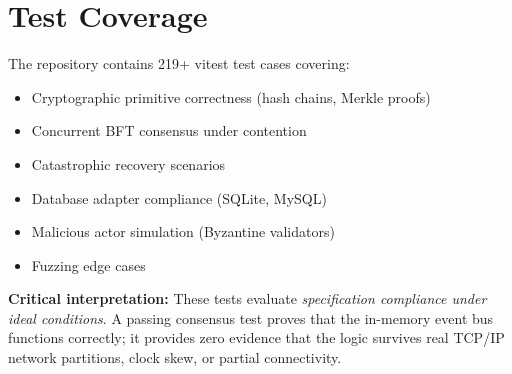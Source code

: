 \section{Test Coverage}
\label{app-sec:wdb-testing}

The repository contains 219+ vitest test cases covering:
\begin{itemize}[nosep]
    \item Cryptographic primitive correctness (hash chains, Merkle proofs)
    \item Concurrent BFT consensus under contention
    \item Catastrophic recovery scenarios
    \item Database adapter compliance (SQLite, MySQL)
    \item Malicious actor simulation (Byzantine validators)
    \item Fuzzing edge cases
\end{itemize}

\textbf{Critical interpretation:} These tests evaluate \textit{specification compliance under ideal conditions}. A passing consensus test proves that the in-memory event bus functions correctly; it provides zero evidence that the logic survives real TCP/IP network partitions, clock skew, or partial connectivity.
